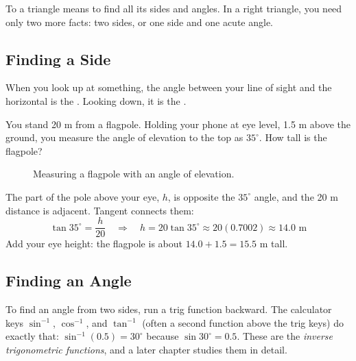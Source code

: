 To  a triangle means to find all its sides and angles. In a right
triangle, you need only two more facts: two sides, or one side and one acute
angle.

\subsection{Finding a Side}
When you look up at something, the angle between your
line of sight and the horizontal is the . Looking
down, it is the .

\begin{Worked}
\begin{Problem}
You stand 20 m from a flagpole. Holding your phone at eye
level, 1.5 m above the ground, you measure the angle of elevation to the top as
$35^\circ$. How tall is the flagpole?

\begin{figure}[H]
\centering
{}
\caption{Measuring a flagpole with an angle of elevation.}
\label{fig:flagpole}
\end{figure}
\end{Problem}
\begin{Solution}
The part of the pole above your eye, $h$, is opposite the
$35^\circ$ angle, and the 20 m distance is adjacent. Tangent connects them:
$$\tan 35^\circ = \frac{h}{20} \quad\Longrightarrow\quad h = 20\tan 35^\circ \approx 20(0.7002) \approx 14.0 \text{ m}$$
Add your eye height: the flagpole is about $14.0 + 1.5 = 15.5$ m tall.
\end{Solution}
\end{Worked}

\subsection{Finding an Angle}
To find an angle from two sides, run a trig function backward. The calculator keys
$\sin^{-1}$, $\cos^{-1}$, and $\tan^{-1}$ (often a second function above the
trig keys) do exactly that: $\sin^{-1}(0.5) = 30^\circ$ because
$\sin 30^\circ = 0.5$. These are the \emph{inverse trigonometric functions}, and a
later chapter studies them in detail.

